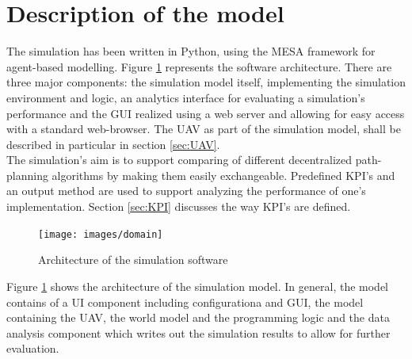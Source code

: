 \section{Description of the model}\label{sec:model}
The simulation has been written in Python, using the MESA \cite{masad.2015} framework for agent-based modelling. Figure \ref{fig:architecture} represents the software architecture. There are three major components: the simulation model itself, implementing the simulation environment and logic, an analytics interface for evaluating a simulation's performance and the GUI realized using a web server and allowing for easy access with a standard web-browser. The UAV as part of the simulation model, shall be described in particular in section \ref{sec:UAV}.\\
The simulation's aim is to support comparing of different decentralized path-planning algorithms by making them easily exchangeable. Predefined KPI's and an output method are used to support analyzing the performance of one's implementation. Section \ref{sec:KPI} discusses the way KPI's are defined.\\
\begin{figure}[tbp]\label{fig:architecture}
	\centering
	\texttt{[image: images/domain]} 
	\caption{Architecture of the simulation software}
\end{figure}
Figure \ref{fig:architecture} shows the architecture of the simulation model. In general, the model contains of a UI component including configurationa and GUI, the model containing the UAV, the world model and the programming logic and the data analysis component which writes out the simulation results to allow for further evaluation. 


